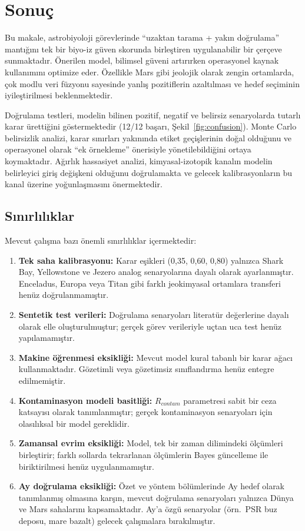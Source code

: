 \documentclass[12pt,a4paper]{article}
\begin{document}
\section{Sonuç}
Bu makale, astrobiyoloji görevlerinde ``uzaktan tarama + yakın doğrulama'' mantığını tek bir biyo-iz güven skorunda birleştiren uygulanabilir bir çerçeve sunmaktadır. Önerilen model, bilimsel güveni artırırken operasyonel kaynak kullanımını optimize eder. Özellikle Mars gibi jeolojik olarak zengin ortamlarda, çok modlu veri füzyonu sayesinde yanlış pozitiflerin azaltılması ve hedef seçiminin iyileştirilmesi beklenmektedir.

Doğrulama testleri, modelin bilinen pozitif, negatif ve belirsiz senaryolarda tutarlı karar ürettiğini göstermektedir (12/12 başarı, Şekil~\ref{fig:confusion}). Monte Carlo belirsizlik analizi, karar sınırları yakınında etiket geçişlerinin doğal olduğunu ve operasyonel olarak ``ek örnekleme'' önerisiyle yönetilebildiğini ortaya koymaktadır. Ağırlık hassasiyet analizi, kimyasal-izotopik kanalın modelin belirleyici giriş değişkeni olduğunu doğrulamakta ve gelecek kalibrasyonların bu kanal üzerine yoğunlaşmasını önermektedir.

\subsection{Sınırlılıklar}
Mevcut çalışma bazı önemli sınırlılıklar içermektedir:
\begin{enumerate}
    \item \textbf{Tek saha kalibrasyonu:} Karar eşikleri (0{,}35, 0{,}60, 0{,}80) yalnızca Shark Bay, Yellowstone ve Jezero analog senaryolarına dayalı olarak ayarlanmıştır. Enceladus, Europa veya Titan gibi farklı jeokimyasal ortamlara transferi henüz doğrulanmamıştır.
    \item \textbf{Sentetik test verileri:} Doğrulama senaryoları literatür değerlerine dayalı olarak elle oluşturulmuştur; gerçek görev verileriyle uçtan uca test henüz yapılamamıştır.
    \item \textbf{Makine öğrenmesi eksikliği:} Mevcut model kural tabanlı bir karar ağacı kullanmaktadır. Gözetimli veya gözetimsiz sınıflandırma henüz entegre edilmemiştir.
    \item \textbf{Kontaminasyon modeli basitliği:} $R_{contam}$ parametresi sabit bir ceza katsayısı olarak tanımlanmıştır; gerçek kontaminasyon senaryoları için olasılıksal bir model gereklidir.
    \item \textbf{Zamansal evrim eksikliği:} Model, tek bir zaman dilimindeki ölçümleri birleştirir; farklı sollarda tekrarlanan ölçümlerin Bayes güncelleme ile biriktirilmesi henüz uygulanmamıştır.
    \item \textbf{Ay doğrulama eksikliği:} Özet ve yöntem bölümlerinde Ay hedef olarak tanımlanmış olmasına karşın, mevcut doğrulama senaryoları yalnızca Dünya ve Mars sahalarını kapsamaktadır. Ay'a özgü senaryolar (örn.\ PSR buz deposu, mare bazalt) gelecek çalışmalara bırakılmıştır.
\end{enumerate}
\end{document}
